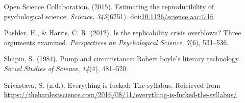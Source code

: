 \documentclass[man]{apa6}
\theoremstyle{definition}
\theoremstyle{definition}
\theoremstyle{definition}
\theoremstyle{remark}
\begin{document}
\leavevmode\hypertarget{ref-open2015estimating}{}%
Open Science Collaboration. (2015). Estimating the reproducibility of
psychological science. \emph{Science}, \emph{349}(6251).
doi:\href{https://doi.org/10.1126/science.aac4716}{10.1126/science.aac4716}

\leavevmode\hypertarget{ref-pashler2012replicability}{}%
Pashler, H., \& Harris, C. R. (2012). Is the replicability crisis
overblown? Three arguments examined. \emph{Perspectives on Psychological
Science}, \emph{7}(6), 531--536.

\leavevmode\hypertarget{ref-shapin1984pump}{}%
Shapin, S. (1984). Pump and circumstance: Robert boyle's literary
technology. \emph{Social Studies of Science}, \emph{14}(4), 481--520.

\leavevmode\hypertarget{ref-srivastava2018everything}{}%
Srivastava, S. (n.d.). Everything is fucked: The syllabus. Retrieved
from
\url{https://thehardestscience.com/2016/08/11/everything-is-fucked-the-syllabus/}

\endgroup
\end{document}

